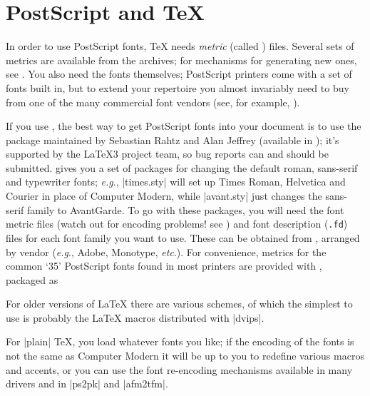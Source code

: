
\section{PostScript and \TeX{}}


In order to use PostScript fonts, \TeX{} needs
\emph{metric} (called ) files. Several sets of metrics are
available from the archives; for mechanisms for generating new ones,
see .  You
also need the fonts themselves; PostScript printers come with a set of
fonts built in, but to extend your repertoire you almost invariably
need to buy from one of the many commercial font vendors (see, for
example, ).

If you use \LaTeXe{}, the best way to get PostScript fonts into your
document is to use the  package maintained by Sebastian Rahtz
and Alan Jeffrey (available in ); it's supported by
the \LaTeX{}3 project team, so bug reports can and should be submitted. 
 gives you a set of packages for changing the default
roman, sans-serif and typewriter fonts; \emph{e.g}., \File|times.sty| will set
up Times Roman, Helvetica and Courier in place of Computer Modern,
while \File|avant.sty| just changes the sans-serif family to
AvantGarde. To go with these packages, you will need the font metric
files (watch out for encoding problems! see
)
and font description (\texttt{.fd}) files for each font family you
want to use. These can be obtained from , arranged by
vendor (\emph{e.g}., Adobe, Monotype, \emph{etc}.). For convenience,
metrics for the common `35' PostScript fonts found in most printers
are provided with , packaged as 

For older versions of \LaTeX{} there are various schemes, of which the
simplest to use is probably the \LaTeX{} macros distributed with
\ProgName|dvips|.

For |plain| \TeX{}, you load whatever fonts you like; if the encoding of
the fonts is not the same as Computer Modern it will be up to you to
redefine various macros and accents, or you can use the font
re-encoding mechanisms available in many drivers and in
\ProgName|ps2pk| and \ProgName|afm2tfm|.

